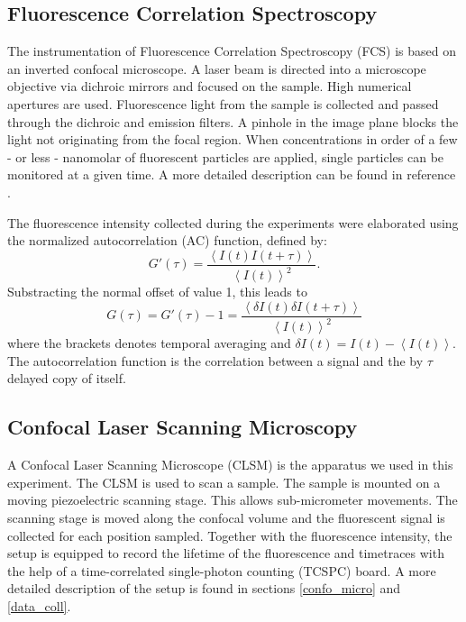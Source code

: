 \documentclass[twoside,single]{lion-msc}
\begin{document}
\subsection{Fluorescence Correlation Spectroscopy}
The instrumentation of Fluorescence Correlation Spectroscopy (FCS) is based on an inverted confocal microscope.  A laser beam is directed into a microscope objective via dichroic mirrors and focused on the sample. High numerical apertures are used. Fluorescence light from the sample is collected and passed through the dichroic and emission filters. A pinhole in the image plane blocks the light not originating from the focal region. When concentrations in order of a few - or less - nanomolar of fluorescent particles are applied, single particles can be monitored at a given time. A more detailed description can be found in reference \cite{Schwille}.

The fluorescence intensity collected during the experiments were elaborated using the normalized autocorrelation (AC) function, defined by:
\begin{equation}
G'(\tau) = \frac{\left \langle I(t)I(t + \tau) \right \rangle}{\left \langle I(t)\right \rangle ^{2}}.
\end{equation}
Substracting the normal offset of value 1, this leads to
\begin{equation} \label{AC}
G(\tau) = G'(\tau) - 1 =  \frac{\left \langle \delta I(t)\delta I(t + \tau) \right \rangle}{\left \langle I(t)\right \rangle ^{2}}
\end{equation}
where the brackets  denotes temporal averaging and $\delta I(t) = I(t) - \left \langle I(t)\right \rangle$. The autocorrelation function is the correlation between a signal and the by $\tau$ delayed copy of itself.

\subsection{Confocal Laser Scanning Microscopy}
A Confocal Laser Scanning Microscope (CLSM) is the apparatus we used in this experiment. The CLSM is used to scan a sample. The sample is mounted on a moving piezoelectric scanning stage. This allows sub-micrometer movements. The scanning stage is moved along the confocal volume and the fluorescent signal is collected for each position sampled. Together with the fluorescence intensity, the setup is equipped to record the lifetime of the fluorescence and timetraces with the help of a time-correlated single-photon counting (TCSPC) board. A more detailed description of the setup is found in sections \ref{confo_micro} and \ref{data_coll}.
\end{document}
